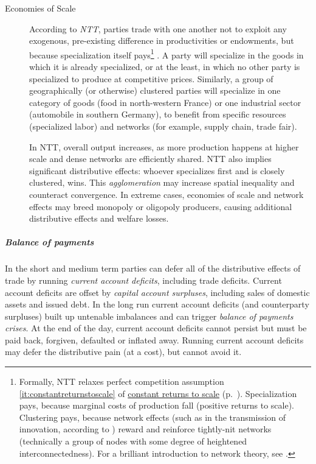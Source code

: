 \begin{description}
	\item[Economies of Scale] \label{it:NTT} According to \emph{\gls{NTT}}, parties trade with one another not to exploit any exogenous, pre-existing difference in productivities or endowments, but because specialization itself pays\footnote{
		Formally, \gls{NTT} relaxes perfect competition assumption \ref{it:constantreturnstoscale} of \hyperref[it:constantreturnstoscale]{constant returns to scale} (p.~\pageref{it:constantreturnstoscale}). Specialization pays, because marginal costs of production fall (positive returns to scale). Clustering pays, because network effects (such as in the transmission of innovation, according to \citealt{Bass1969}) reward and reinforce tightly-nit networks (technically a group of nodes with some degree of heightened interconnectedness). For a brilliant introduction to network theory, see \cite{Kleinberg-2009-oz}.}
	\citep{Krugman-1980-aa}. A party will specialize in the goods in which it is already specialized, or at the least, in which no other party is specialized to produce at competitive prices. Similarly, a group of geographically (or otherwise) clustered parties will specialize in one category of goods (food in north-western France) or one industrial sector (automobile in southern Germany), to benefit from specific resources (specialized labor) and networks (for example, supply chain, trade fair).

	In \gls{NTT}, overall output increases, as more production happens at higher scale and dense networks are efficiently shared. \gls{NTT} also implies significant distributive effects: whoever specializes first and is closely clustered, wins. This \emph{agglomeration} may increase spatial inequality and counteract convergence. %
	In extreme cases, economies of scale and network effects may breed monopoly or oligopoly producers, causing additional distributive effects and welfare losses.
\end{description}

\subparagraph{Balance of payments}
In the short and medium term parties can defer all of the distributive effects of trade by running \emph{current account deficits}, including trade deficits. Current account deficits are offset by \emph{capital account surpluses}, including sales of domestic assets and issued debt. In the long run current account deficits (and counterparty surpluses) built up untenable imbalances and can trigger \emph{balance of payments crises}. At the end of the day, current account deficits cannot persist but must be paid back, forgiven, defaulted or inflated away. Running current account deficits may defer the distributive pain (at a cost), but cannot avoid it.

